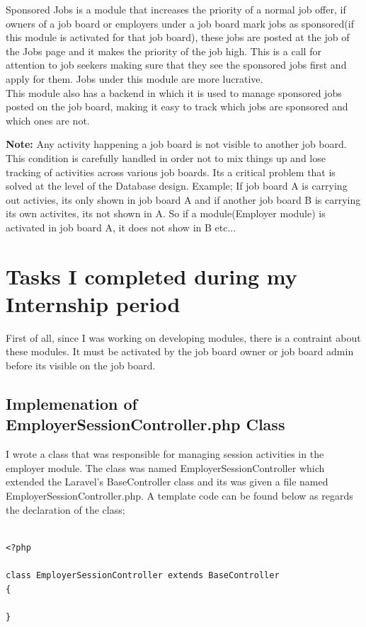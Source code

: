 Sponsored Jobs is a module that increases the priority of a normal job offer, if owners of a job board or employers under a job board mark jobs as sponsored(if this module is activated for that job board), these jobs are posted at the job of the Jobs page and it makes the priority of the job high. This is a call for attention to job seekers making sure that they see the sponsored jobs first and apply for them. Jobs under this module are more lucrative. \\ 

This module also has a backend in which it is used to manage sponsored jobs posted on the job board, making it easy to track which jobs are sponsored and which ones are not.

\textbf{Note:} Any activity happening a job board is not visible to another job board. This condition is carefully handled in order not to mix things up and lose tracking of activities across various job boards. Its a critical problem that is solved at the level of the Database design. Example; If job board A is carrying out activies, its only shown in job board A and if another job board B is carrying its own activites, its not shown in A. So if a module(Employer module) is activated in job board A, it does not show in B etc...

\section{Tasks I completed during my Internship period}

First of all, since I was working on developing modules, there is a contraint about these modules. It must be activated by the job board owner or job board admin before its visible on the job board.

\subsection{Implemenation of EmployerSessionController.php Class}

I wrote a class that was responsible for managing session activities in the employer module. The class was named EmployerSessionController { }  which extended the Laravel's BaseController { } class and its was given a file named EmployerSessionController.php. A template code can be found below as regards the declaration of the class; \\

\begin{lstlisting}

<?php

class EmployerSessionController extends BaseController
{

}

\end{lstlisting}

